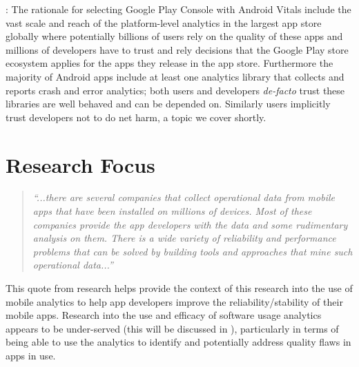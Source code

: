 : 
The rationale for selecting Google Play Console with Android Vitals include the vast scale and reach of the platform-level analytics in the largest app store globally where potentially billions of users rely on the quality of these apps and millions of developers have to trust and rely decisions that the Google Play store ecosystem applies for the apps they release in the app store. Furthermore the majority of Android apps include at least one analytics library that collects and reports crash and error analytics; both users and developers \emph{de-facto} trust these libraries are well behaved and can be depended on. Similarly users implicitly trust developers not to do net harm, a topic we cover shortly. %


\section{Research Focus}
\begin{quote}
    \emph{``...there are several companies that collect operational data from mobile apps that have been installed on millions of devices. Most of these companies provide the app developers with the data and some rudimentary analysis on them. There is a wide variety of reliability and performance problems that can be solved by building tools and approaches that mine such operational data...''}~ 
\end{quote} 

This quote from research helps provide the context of this research into the use of mobile analytics to help app developers improve the reliability/stability of their mobile apps.
%
Research into the use and efficacy of software usage analytics appears to be under-served (this will be discussed in ), particularly in terms of being able to use the analytics to identify and potentially address quality flaws in apps in use.

